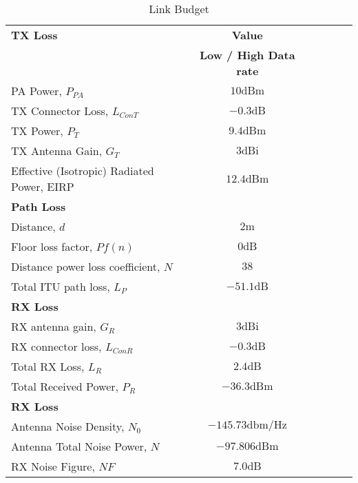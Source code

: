\begin{table}[htbp]
  \centering
  \caption{Link Budget}
    \begin{tabular}{lccccr}
    \rowcolor[rgb]{ 0,  0,  0} \textcolor[rgb]{ 1,  1,  1}{\textbf{TX Loss}}	& \textcolor[rgb]{ 1,  1,  1}{\textbf{Value}} 		\\
    \rowcolor[rgb]{ 0,  0,  0} \textcolor[rgb]{ 1,  1,  1}{} & \textcolor[rgb]{ 1,  1,  1}{\textbf{Low / High Data rate}} 		\\
    PA Power, $P_{PA}$ 						& $10 \text{dBm}$											\\
    TX Connector Loss, $L_{ConT}$  				& $-0.3 \text{dB}$ 											\\
    TX Power, $P_T$ 							& $9.4 \text{dBm}$											\\
    TX Antenna Gain, $G_T$ 					& $3 \text{dBi}$ 											\\
    Effective (Isotropic) Radiated Power, EIRP  		& $12.4 \text{dBm}$										\\
    
    \rowcolor[rgb]{ 0,  0,  0} \textcolor[rgb]{ 1,  1,  1}{\textbf{Path Loss}}
    & \textcolor[rgb]{ 1,  1,  1}{\textbf{}} 															\\
    Distance, $d$  							& $2 \text{m}$ 											\\
    Floor loss factor, $Pf(n)$ 					& $0 \text{dB}$											\\
    Distance power loss coefficient, $N$ 			& $38$ 												\\
    Total ITU path loss, $L_P$ 					& $-51.1 \text{dB}$										\\
    
    \rowcolor[rgb]{ 0,  0,  0} \textcolor[rgb]{ 1,  1,  1}{\textbf{RX Loss}}	& \textcolor[rgb]{ 1,  1,  1}{\textbf{}} 			\\
    RX antenna gain, $G_R$					& $3 \text{dBi}$ 											\\
    RX connector loss, $L_{ConR}$ 				& $-0.3 \text{dB}$ 											\\
    Total RX Loss, $L_R$						& $2.4 \text{dB}$											\\
    Total Received Power, $P_R$ 				& $-36.3 \text{dBm}$										\\
    
    \rowcolor[rgb]{ 0,  0,  0} \textcolor[rgb]{ 1,  1,  1}{\textbf{RX Loss}}	& \textcolor[rgb]{ 1,  1,  1}{\textbf{}} 			\\
    Antenna Noise Density, $N_0$ 				& $-145.73 \text{dbm/Hz}$								\\
    Antenna Total Noise Power, $N$   				& $-97.806 \text{dBm}$										\\
    RX Noise Figure, $NF$ 					& $7.0 \text{dB}$									\\
        

\end{tabular}
\end{table}
